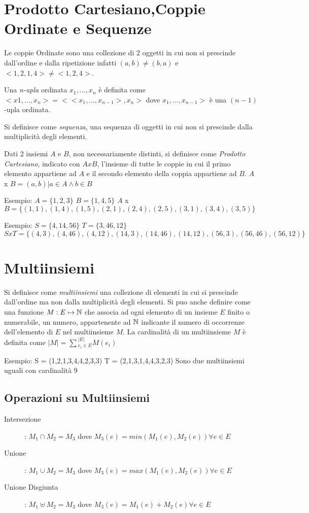 \section{Prodotto Cartesiano,Coppie Ordinate e Sequenze}
Le coppie Ordinate sono una collezione di 2 oggetti in cui non si prescinde
dall'ordine e dalla ripetizione infatti $(a,b) \neq (b,a)$ e $<1,2,1,4> \neq <1,2,4>$.

Una \emph{n-upla} ordinata $x_1,\dots,x_n$ è definita come $<x1,\dots,x_n> = < <x_1,\dots,x_{n-1}>,x_n>$
dove $x_1,\dots,x_{n-1}>$ è una $(n-1)$-upla ordinata.

Si definisce come \emph{sequenza}, una sequenza di oggetti in cui non si prescinde
dalla multiplicità degli elementi.

Dati 2 insiemi $A$ e $B$, non necessariamente  distinti, si definisce come \textit{Prodotto Cartesiano},
indicato con $A x B$, l'insieme di tutte le coppie in cui il primo elemento appartiene ad $A$
e il secondo elemento della coppia appartiene ad $B$.\newline
$A$ x $B = {(a,b) | a \in A \land b \in B} $

Esempio:\newline
$A = \{1,2,3\}$ \newline
$B = \{1,4,5\}$ \newline
$A$ x $B = \{(1,1),(1,4),(1,5),(2,1),(2,4),(2,5),(3,1),(3,4),(3,5)\} $

Esempio:
$S = \{ 4,14,56 \}$
$T = \{ 3,46,12 \}$
$S x T = \{(4,3),(4,46),(4,12),(14,3),(14,46),(14,12),(56,3),(56,46),(56,12) \}$

\section{Multiinsiemi}
Si definisce come \emph{multiinsiemi} una collezione di elementi in cui si prescinde
dall'ordine ma non dalla multiplicità degli elementi.\newline
Si puo anche definire come una funzione $M:E \mapsto \mathbb{N}$ che associa ad ogni elemento
di un insieme $E$ finito o numerabile, un numero, appartenente ad $\mathbb{N}$ indicante
il numero di occorrenze dell'elemento di $E$ nel multiinsieme $M$.\newline
La cardinalità di un multiinsieme $M$ è definita come $|M| = \sum{_{e_i \in E} ^ {|E|}} M(e_i)$

Esempio:
S = (1,2,1,3,4,4,2,3,3)
T = (2,1,3,1,4,4,3,2,3)
Sono due multiinsiemi uguali con cardinalità 9

\subsection{Operazioni su Multiinsiemi}
\begin{description}
    \item[Intersezione]: $M_1 \cap M_2 = M_3$ dove $M_3(e) = min(M_1(e),M_2(e)) \forall e \in E$
    \item[Unione]: $M_1 \cup M_2 = M_3$ dove $M_3(e) = max(M_1(e),M_2(e)) \forall e \in E$
    \item[Unione Disgiunta]: $M_1 \uplus M_2 = M_3$ dove $M_3(e) = M_1(e) + M_2(e) \forall e \in E$
\end{description}
